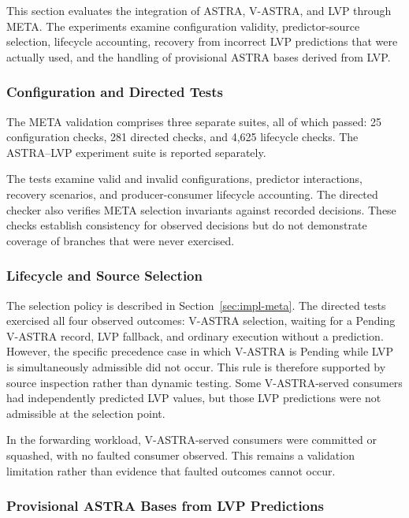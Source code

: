 This section evaluates the integration of ASTRA, V-ASTRA, and LVP
through META. The experiments examine configuration validity,
predictor-source selection, lifecycle accounting, recovery from
incorrect LVP predictions that were actually used, and the handling
of provisional ASTRA bases derived from LVP.

\subsubsection{Configuration and Directed Tests}
\label{subsubsec:meta-configuration-directed-tests}

The META validation comprises three separate suites, all of which
passed: 25 configuration checks, 281 directed checks, and 4,625
lifecycle checks. The ASTRA--LVP experiment suite is reported
separately.

The tests examine valid and invalid configurations, predictor
interactions, recovery scenarios, and producer-consumer lifecycle
accounting. The directed checker also verifies META selection
invariants against recorded decisions. These checks establish
consistency for observed decisions but do not demonstrate coverage
of branches that were never exercised.

\subsubsection{Lifecycle and Source Selection}
\label{subsubsec:meta-lifecycle-source-selection}

The selection policy is described in Section~\ref{sec:impl-meta}.
The directed tests exercised all four observed outcomes: V-ASTRA
selection, waiting for a Pending V-ASTRA record, LVP fallback, and
ordinary execution without a prediction. However, the specific
precedence case in which V-ASTRA is Pending while LVP is simultaneously
admissible did not occur. This rule is therefore supported by source
inspection rather than dynamic testing. Some V-ASTRA-served consumers
had independently predicted LVP values, but those LVP predictions
were not admissible at the selection point.

In the forwarding workload, V-ASTRA-served consumers were committed
or squashed, with no faulted consumer observed. This remains a
validation limitation rather than evidence that faulted outcomes
cannot occur.

\subsubsection{Provisional ASTRA Bases from LVP Predictions}
\label{subsubsec:meta-provisional-bases-validation}

